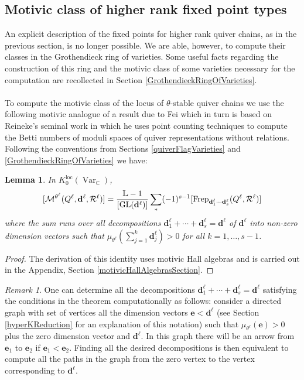 \documentclass{amsart}
\theoremstyle{plain}
\newtheorem{lemma}[theorem]{Lemma}
\numberwithin{equation}{section}
\theoremstyle{definition}
\theoremstyle{remark}
\newtheorem{remark}[theorem]{Remark}
\begin{document}
	\subsection{Motivic class of higher rank fixed point types}\label{motivicClassHigherRankStarShapedQuiver}
	An explicit description of the fixed points for higher rank quiver chains, as in the previous section, is no longer possible. We are able, however, to compute their classes in the Grothendieck ring of varieties. Some useful facts regarding the construction of this ring and the motivic class of some varieties necessary for the computation are recollected in Section \ref{GrothendieckRingOfVarieties}.
	\\
	\\
	To compute the motivic class of the locus of $\theta$-stable quiver chains we use the following motivic analogue of a result due to Fei \cite[Lemma 3.5]{FeiQuiversWithRelations} which in turn is based on Reineke's seminal work \cite{ReinekePointCounting} in which he uses point counting techniques to compute the Betti numbers of moduli spaces of quiver representations without relations.  Following the conventions from Sections \ref{quiverFlagVarieties} and \ref{GrothendieckRingOfVarieties} we have:
	\begin{lemma}\label{MotivicFeiIdentity}
		In $K_0^{\operatorname{loc}}(\operatorname{Var}_{\mathbb{C}})$, 
		$$
		[\mathcal{M}^{\theta^\ell}(Q^\ell,\mathbf{d}^\ell,\mathcal{R}^\ell)]=\frac{\mathbb{L}-1}{[\operatorname{GL}(\mathbf{d}^\ell)]}\sum_{*}(-1)^{s-1}[{\normalfont\text{Frep}_{\mathbf{d}^\ell_1\cdots\mathbf{d}^\ell_s}}(Q^\ell,\mathcal{R}^\ell)]
		$$
		where the sum runs over all decompositions $\mathbf{d}^\ell_1+\cdots+\mathbf{d}^\ell_s=\mathbf{d}^\ell$ of $\mathbf{d}^\ell$ into non-zero dimension vectors such that $\mu_{\theta^\ell}(\sum_{j=1}^k\mathbf{d}^\ell_j)>0$ for all $k=1,\ldots,s-1$.
	\end{lemma}
	\begin{proof}
	The derivation of this identity uses motivic Hall algebras and is carried out in the Appendix, Section \ref{motivicHallAlgebrasSection}. 
	\end{proof}
	\begin{remark}
	One can determine all the decompositions $\mathbf{d}_1^\ell+\cdots+\mathbf{d}_s^\ell=\mathbf{d}^\ell$ satisfying the conditions in the theorem computationally as follows: consider a directed graph with set of vertices all the dimension vectors $\mathbf{e}<\mathbf{d}^\ell$ (see Section \ref{hyperKReduction} for an explanation of this notation) such that $\mu_{\theta^\ell}(\mathbf{e})>0$ plus the zero dimension vector and $\mathbf{d}^\ell$. In this graph there will be an arrow from $\mathbf{e}_1$ to $\mathbf{e}_2$ if $\mathbf{e}_1<\mathbf{e}_2$. Finding all the desired decompositions is then equivalent to compute all the paths in the graph from the zero vertex to the vertex corresponding to $\mathbf{d}^\ell$. 
	\end{remark}
\end{document}
